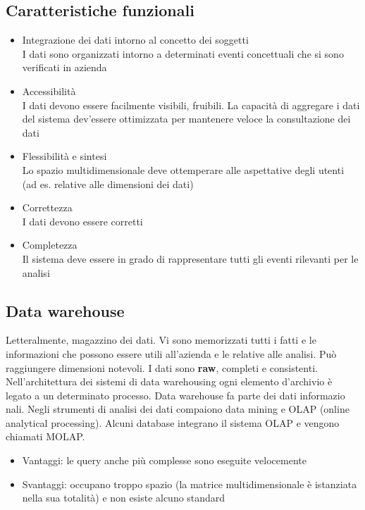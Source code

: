 \subsection{Caratteristiche
funzionali}\label{caratteristiche-funzionali}

\begin{itemize}

\item
  Integrazione dei dati intorno al concetto dei soggetti\\
  I dati sono organizzati intorno a determinati eventi concettuali che
  si sono verificati in azienda
\item
  Accessibilit\`a\\
  I dati devono essere facilmente visibili, fruibili. La capacit\`a di
  aggregare i dati del sistema dev'essere ottimizzata per mantenere
  veloce la consultazione dei dati
\item
  Flessibilit\`a e sintesi\\
  Lo spazio multidimensionale deve ottemperare alle aspettative degli
  utenti (ad es. relative alle dimensioni dei dati)
\item
  Correttezza\\
  I dati devono essere corretti
\item
  Completezza\\
  Il sistema deve essere in grado di rappresentare tutti gli eventi
  rilevanti per le analisi
\end{itemize}

\subsection{Data warehouse}\label{data-warehouse}

Letteralmente, magazzino dei dati. Vi sono memorizzati tutti i fatti e
le informazioni che possono essere utili all'azienda e le relative alle analisi.
Pu\`o raggiungere dimensioni notevoli. I dati sono \textbf{raw}, completi e consistenti.\\
Nell'architettura dei sistemi di data warehousing ogni elemento
d'archivio \`e legato a un determinato processo. Data warehouse fa parte
dei dati informazio\- nali. Negli strumenti di analisi dei dati compaiono
data mining e OLAP (online analytical processing). Alcuni database integrano il sistema OLAP e vengono chiamati MOLAP.

\begin{itemize}

\item
  Vantaggi: le query anche pi\`u complesse sono eseguite velocemente
\item
  Svantaggi: occupano troppo spazio (la matrice multidimensionale \`e
  istanziata nella sua totalit\`a) e non esiste alcuno standard
\end{itemize}

